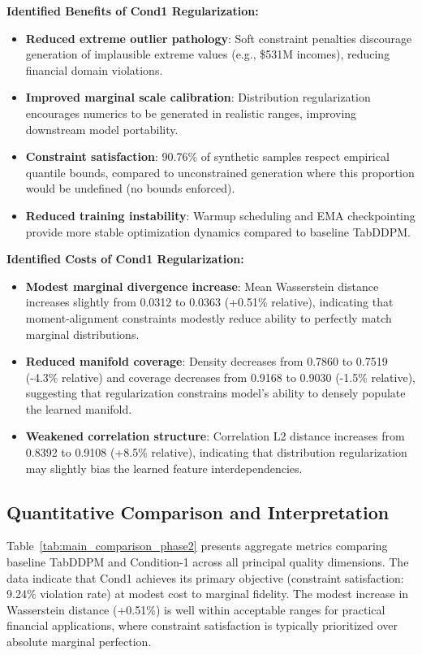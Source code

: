 \documentclass[10pt,conference,a4paper]{IEEEtran}
\begin{document}
\textbf{Identified Benefits of Cond1 Regularization:}
\begin{itemize}
    \item \textbf{Reduced extreme outlier pathology}: Soft constraint penalties discourage generation of implausible extreme values (e.g., \$531M incomes), reducing financial domain violations.
    \item \textbf{Improved marginal scale calibration}: Distribution regularization encourages numerics to be generated in realistic ranges, improving downstream model portability.
    \item \textbf{Constraint satisfaction}: 90.76\% of synthetic samples respect empirical quantile bounds, compared to unconstrained generation where this proportion would be undefined (no bounds enforced).
    \item \textbf{Reduced training instability}: Warmup scheduling and EMA checkpointing provide more stable optimization dynamics compared to baseline TabDDPM.
\end{itemize}

\textbf{Identified Costs of Cond1 Regularization:}
\begin{itemize}
    \item \textbf{Modest marginal divergence increase}: Mean Wasserstein distance increases slightly from 0.0312 to 0.0363 (+0.51\% relative), indicating that moment-alignment constraints modestly reduce ability to perfectly match marginal distributions.
    \item \textbf{Reduced manifold coverage}: Density decreases from 0.7860 to 0.7519 (-4.3\% relative) and coverage decreases from 0.9168 to 0.9030 (-1.5\% relative), suggesting that regularization constrains model's ability to densely populate the learned manifold.
    \item \textbf{Weakened correlation structure}: Correlation L2 distance increases from 0.8392 to 0.9108 (+8.5\% relative), indicating that distribution regularization may slightly bias the learned feature interdependencies.
\end{itemize}

\subsection{Quantitative Comparison and Interpretation}
Table~\ref{tab:main_comparison_phase2} presents aggregate metrics comparing baseline TabDDPM and Condition-1 across all principal quality dimensions. The data indicate that Cond1 achieves its primary objective (constraint satisfaction: 9.24\% violation rate) at modest cost to marginal fidelity. The modest increase in Wasserstein distance (+0.51\%) is well within acceptable ranges for practical financial applications, where constraint satisfaction is typically prioritized over absolute marginal perfection.
\end{document}
